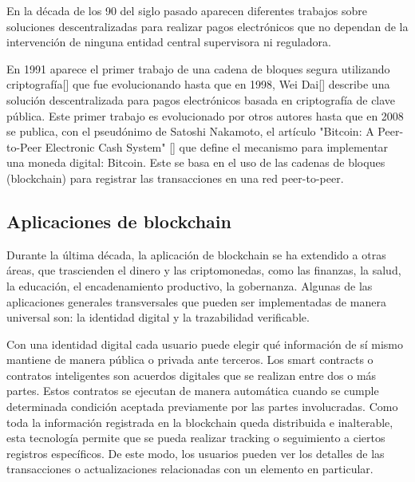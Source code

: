 En la década de los 90 del siglo pasado aparecen diferentes trabajos sobre soluciones descentralizadas para realizar pagos electrónicos que no dependan de la intervención de ninguna entidad central supervisora ni reguladora.

En 1991 aparece el primer trabajo de una cadena de bloques segura utilizando criptografía[\cite{200}] que fue evolucionando hasta que en 1998, Wei Dai[\cite{201}] describe una solución descentralizada para pagos electrónicos basada en criptografía de clave pública. Este primer trabajo es evolucionado por otros autores hasta que en 2008 se publica, con el pseudónimo de Satoshi Nakamoto, el artículo "Bitcoin: A Peer-to-Peer Electronic Cash System" [\cite{nakamoto2008bitcoin}] que define el mecanismo para implementar una moneda digital: Bitcoin. Este se basa en el uso de las cadenas de bloques (blockchain) para registrar las transacciones en una red peer-to-peer.

\subsection{Aplicaciones de blockchain}
Durante la última década, la aplicación de blockchain se ha extendido a otras áreas, que trascienden el dinero y las criptomonedas, como las finanzas, la salud, la educación, el encadenamiento productivo, la gobernanza. Algunas de las aplicaciones generales transversales que pueden ser implementadas de manera universal son: la identidad digital y la trazabilidad verificable.

Con una identidad digital cada usuario puede elegir qué información de sí mismo mantiene de manera pública o privada ante terceros. Los smart contracts o contratos inteligentes son acuerdos digitales que se realizan entre dos o más partes. Estos contratos se ejecutan de manera automática cuando se cumple determinada condición aceptada previamente por las partes involucradas. Como toda la información registrada en la blockchain queda distribuida e inalterable, esta tecnología permite que se pueda realizar tracking o seguimiento a ciertos registros específicos. De este modo, los usuarios pueden ver los detalles de las transacciones o actualizaciones relacionadas con un elemento en particular.

